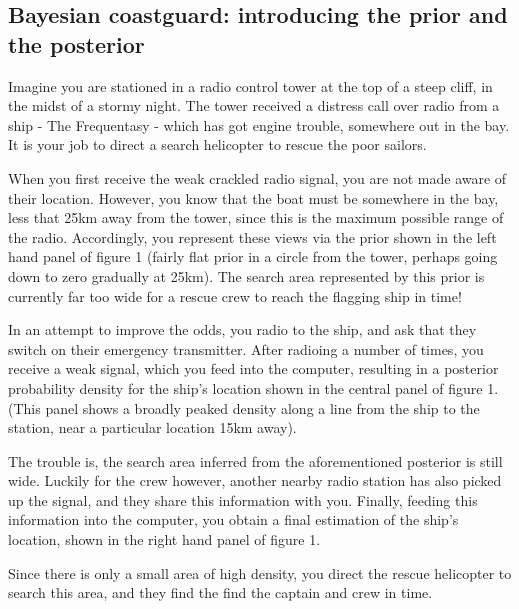 \documentclass[11pt,fullpage]{book}
\begin{document}
\subsection{Bayesian coastguard: introducing the prior and the posterior}
Imagine you are stationed in a radio control tower at the top of a steep cliff, in the midst of a stormy night. The tower received a distress call over radio from a ship - The Frequentasy - which has got engine trouble, somewhere out in the bay. It is your job to direct a search helicopter to rescue the poor sailors.

When you first receive the weak crackled radio signal, you are not made aware of their location. However, you know that the boat must be somewhere in the bay, less that 25km away from the tower, since this is the maximum possible range of the radio. Accordingly, you represent these views via the prior shown in the left hand panel of figure 1 (fairly flat prior in a circle from the tower, perhaps going down to zero gradually at 25km). The search area represented by this prior is currently far too wide for a rescue crew to reach the flagging ship in time!

In an attempt to improve the odds, you radio to the ship, and ask that they switch on their emergency transmitter. After radioing a number of times, you receive a weak signal, which you feed into the computer, resulting in a posterior probability density for the ship's location shown in the central panel of figure 1. (This panel shows a broadly peaked density along a line from the ship to the station, near a particular location 15km away).

The trouble is, the search area inferred from the aforementioned posterior is still wide. Luckily for the crew however, another nearby radio station has also picked up the signal, and they share this information with you. Finally, feeding this information into the computer, you obtain a final estimation of the ship's location, shown in the right hand panel of figure 1. 

Since there is only a small area of high density, you direct the rescue helicopter to search this area, and they find the find the captain and crew in time.
\end{document}

